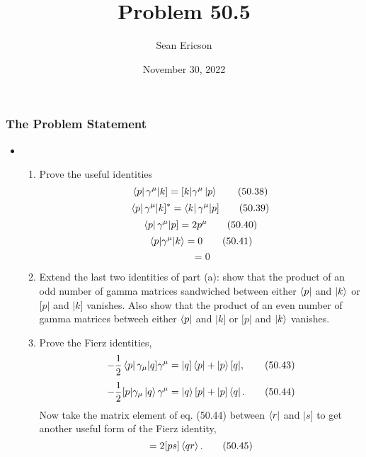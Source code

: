 \documentclass{beamer}
\title{Problem 50.5}
\author{Sean Ericson}
\institute{Phys 465}
\date{November 30, 2022}
\begin{document}
\frame{\titlepage}

\begin{frame}
\frametitle{The Problem Statement}
\begin{itemize}
    \item \begin{enumerate}[label=(\alph*)]
        \item<only@1> Prove the useful identities
        \begin{equation} \bra{p}\gamma^\mu|k] = [k|\gamma^\mu\ket{p} \tag{50.38} \end{equation}
        \begin{equation} \bra{p}\gamma^\mu|k]^* = \bra{k}\gamma^\mu|p] \tag{50.39} \end{equation}
        \begin{equation} \bra{p}\gamma^\mu|p] = 2p^\mu \tag{50.40} \end{equation}
        \begin{equation} \mel{p}{\gamma^\mu}{k} = 0 \tag{50.41} \end{equation}
        \begin{equation} [p|\gamma^\mu|k] = 0 \tag{50.42} \end{equation}
        
        \item<only@2> Extend the last two identities of part (a): show that the product of an odd number of gamma matrices sandwiched between either $\bra{p}$ and $\ket{k}$ or $[p|$ and $|k]$ vanishes. Also show that the product of an even number of gamma matrices betweeh either $\bra{p}$ and $|k]$ or $[p|$ and $\ket{k}$ vanishes.
        \item<only@3> Prove the Fierz identities,
        \begin{equation} -\frac{1}{2}\bra{p}\gamma_\mu|q]\gamma^\mu = |q]\bra{p} + \ket{p}[q|, \tag{50.43} \end{equation}
        \begin{equation} -\frac{1}{2}[p|\gamma_\mu\ket{q}\gamma^\mu = \ket{q}[p| + |p]\bra{q}. \tag{50.44} \end{equation}
        Now take the matrix element of eq. (50.44) between $\bra{r}$ and $|s]$ to get another useful form of the Fierz identity,
        \begin{equation} [p|\gamma^\mu\ket{q}\bra{r}\gamma_\mu|s] = 2[ps]\ev{qr}. \tag{50.45} \end{equation}
    \end{enumerate}
\end{itemize}
\end{frame}
\end{document}
